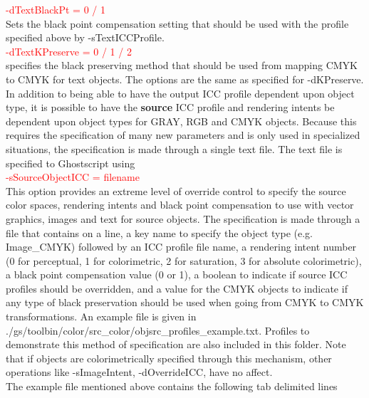 \documentclass[12pt,notitlepage]{article}
\begin{document}
\textcolor{red}{-dTextBlackPt = 0 / 1}\\

\noindent Sets the black point compensation setting that should be used with the profile specified above by -sTextICCProfile.\\

\textcolor{red}{-dTextKPreserve = 0 / 1 / 2}\\

\noindent specifies the black preserving method that should be used from mapping CMYK to CMYK for text objects.   The
options are the same as specified for -dKPreserve.\\

In addition to being able to have the output ICC profile dependent upon object type, it is possible to have the {\bf source} ICC profile and rendering intents be dependent upon object types for GRAY, RGB and CMYK objects.  Because this requires the specification of many new parameters and is only used in specialized situations, the specification is made through a single text file.  The text file is specified to Ghostscript using\\

\textcolor{red}{-sSourceObjectICC = filename}\\

This option provides an extreme level of override control to specify the source color spaces, rendering intents and black point compensation to use with vector graphics, images and text for source objects. The specification is made through a file that contains on a line, a key name to specify the object type (e.g. Image\_CMYK) followed by an ICC profile file name, a rendering intent number (0 for perceptual, 1 for colorimetric, 2 for saturation, 3 for absolute colorimetric), a black point compensation value (0 or 1), a boolean to indicate if source ICC profiles should be overridden, and a value for the CMYK objects to indicate if any type of black preservation should be used when going from CMYK to CMYK transformations. An example file is given in ./gs/toolbin/color/src\_color/objsrc\_profiles\_example.txt. Profiles to demonstrate this method of specification are also included in this folder. Note that if objects are colorimetrically specified through this mechanism, other operations like -sImageIntent, -dOverrideICC, have no affect.\\

The example file mentioned above contains the following tab delimited lines\\
\end{document}
